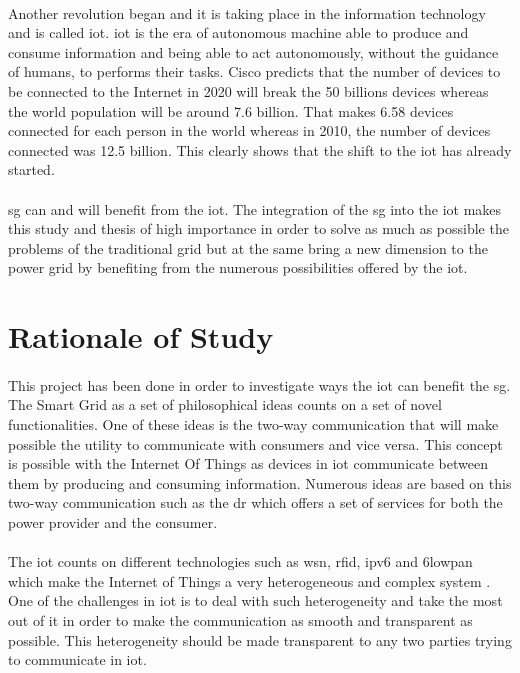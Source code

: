 \documentclass[oneside,12pt,a4paper,final]{book}
\begin{document}
\paragraph{}
Another revolution began and it is taking place in the information technology and is called \gls{iot}. \gls{iot} is the era of autonomous machine able to produce and consume information and being able to act autonomously, without the guidance of humans, to performs their tasks. Cisco predicts that the number of devices to be connected to the Internet in 2020 will break the 50 billions devices \cite{ref3} whereas the world population will be around 7.6 billion. That makes 6.58 devices connected for each person in the world whereas in 2010, the number of devices connected was 12.5 billion. This clearly shows that the shift to the \gls{iot} has already started.
\paragraph{}
\gls{sg} can and will benefit from the \gls{iot}. The integration of the \gls{sg} into the \gls{iot} makes this study and thesis of high importance in order to solve as much as possible the problems of the traditional grid but at the same bring a new dimension to the power grid by benefiting from the numerous possibilities offered by the \gls{iot}.

\section{Rationale of Study}
\paragraph{}
This project has been done in order to investigate ways the \gls{iot} can benefit the \gls{sg}. The Smart Grid as a set of philosophical ideas counts on a set of novel functionalities. One of these ideas is the two-way communication that will make possible the utility to communicate with consumers and vice versa. This concept is possible with the Internet Of Things as devices in \gls{iot} communicate between them by producing and consuming information. Numerous ideas are based on this two-way communication such as the \gls{dr} which offers a set of services for both the power provider and the consumer.
\paragraph{}
The \gls{iot} counts on different technologies such as \gls{wsn}, \gls{rfid}, \gls{ipv6} and \gls{6lowpan} which make the Internet of Things a very heterogeneous and complex system \cite{ref4}. One of the challenges in \gls{iot} is to deal with such heterogeneity and take the most out of it in order to make the communication as smooth and transparent as possible. This heterogeneity should be made transparent to any two parties trying to communicate in \gls{iot}.
\end{document}
